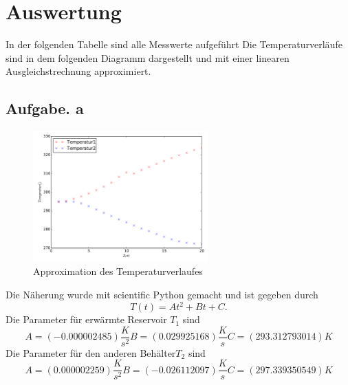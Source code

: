 \section{Auswertung}
\label{sec:Auswertung}
In der folgenden Tabelle sind alle Messwerte aufgeführt
Die Temperaturverläufe sind in dem folgenden Diagramm dargestellt und mit einer
linearen Ausgleichstrechnung approximiert.
\subsection{Aufgabe. a}
\begin{figure}
  \centering
  \includegraphics[width=0.60\textwidth]{Temperaturgraphik.pdf}
  \caption{Approximation des Temperaturverlaufes}
  \label{fig:Tempverlauf}
\end{figure}
Die Näherung wurde mit scientific Python gemacht und ist gegeben durch
\begin{equation}
  T(t)=At^2+Bt+C .
\end{equation}
Die Parameter für erwärmte Reservoir $T_1$ sind
\begin{equation}
  A=(  -0.000002485)\frac{K}{s^2}
  B=(   0.029925168)\frac{K}{s}
  C=( 293.312793014)K
\end{equation}
Die Parameter für den anderen Behälter$T_2$ sind
\begin{equation}
  A=(  0.000002259)\frac{K}{s^2}
  B=( -0.026112097)\frac{K}{s}
  C=(297.339350549)K

\end{equation}
